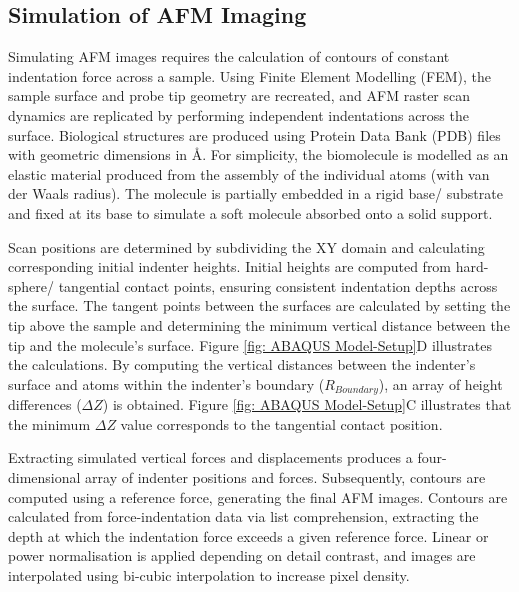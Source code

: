 \subsection{Simulation of AFM Imaging}

Simulating AFM images requires the calculation of contours of constant indentation force across a sample. Using Finite Element Modelling (FEM), the sample surface and probe tip geometry are recreated, and AFM raster scan dynamics are replicated by performing independent indentations across the surface. Biological structures are produced using Protein Data Bank (PDB) files with geometric dimensions in $\text{\AA}$. For simplicity, the biomolecule is modelled as an elastic material produced from the assembly of the individual atoms (with van der Waals radius). The molecule is partially embedded in a rigid base/ substrate and fixed at its base to simulate a soft molecule absorbed onto a solid support. 

Scan positions are determined by subdividing the XY domain and calculating corresponding initial indenter heights. Initial heights are computed from hard-sphere/ tangential contact points, ensuring consistent indentation depths across the surface. The tangent points between the surfaces are calculated by setting the tip above the sample and determining the minimum vertical distance between the tip and the molecule's surface. Figure \ref{fig: ABAQUS Model-Setup}D illustrates the calculations. By computing the vertical distances between the indenter's surface and atoms within the indenter's boundary ($R_{Boundary}$), an array of height differences ($\Delta Z$) is obtained. Figure \ref{fig: ABAQUS Model-Setup}C illustrates that the minimum $\Delta Z$ value corresponds to the tangential contact position. %

Extracting simulated vertical forces and displacements produces a four-dimensional array of indenter positions and forces. Subsequently, contours are computed using a reference force, generating the final AFM images. Contours are calculated from force-indentation data via list comprehension, extracting the depth at which the indentation force exceeds a given reference force. Linear or power normalisation is applied depending on detail contrast, and images are interpolated using bi-cubic interpolation to increase pixel density.